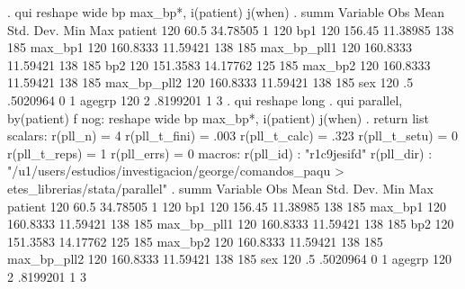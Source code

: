 . qui reshape wide bp max_bp*, i(patient) j(when)
{\smallskip}
. summ 
{\smallskip}
    Variable {\VBAR}       Obs        Mean    Std. Dev.       Min        Max
     patient {\VBAR}       120        60.5    34.78505          1        120
         bp1 {\VBAR}       120      156.45    11.38985        138        185
     max_bp1 {\VBAR}       120    160.8333    11.59421        138        185
 max_bp_pll1 {\VBAR}       120    160.8333    11.59421        138        185
         bp2 {\VBAR}       120    151.3583    14.17762        125        185
     max_bp2 {\VBAR}       120    160.8333    11.59421        138        185
 max_bp_pll2 {\VBAR}       120    160.8333    11.59421        138        185
         sex {\VBAR}       120          .5    .5020964          0          1
      agegrp {\VBAR}       120           2    .8199201          1          3
{\smallskip}
. qui reshape long
{\smallskip}
. qui parallel, by(patient) f nog: reshape wide bp max_bp*, i(patient) j(when)
{\smallskip}
. return list
{\smallskip}
scalars:
              r(pll_n) =  4
         r(pll_t_fini) =  .003
         r(pll_t_calc) =  .323
         r(pll_t_setu) =  0
         r(pll_t_reps) =  1
           r(pll_errs) =  0
{\smallskip}
macros:
             r(pll_id) : "r1c9jesifd"
            r(pll_dir) : "/u1/users/estudios/investigacion/george/comandos_paqu
> etes_librerias/stata/parallel"
{\smallskip}
. summ
{\smallskip}
    Variable {\VBAR}       Obs        Mean    Std. Dev.       Min        Max
     patient {\VBAR}       120        60.5    34.78505          1        120
         bp1 {\VBAR}       120      156.45    11.38985        138        185
     max_bp1 {\VBAR}       120    160.8333    11.59421        138        185
 max_bp_pll1 {\VBAR}       120    160.8333    11.59421        138        185
         bp2 {\VBAR}       120    151.3583    14.17762        125        185
     max_bp2 {\VBAR}       120    160.8333    11.59421        138        185
 max_bp_pll2 {\VBAR}       120    160.8333    11.59421        138        185
         sex {\VBAR}       120          .5    .5020964          0          1
      agegrp {\VBAR}       120           2    .8199201          1          3
{\smallskip}

